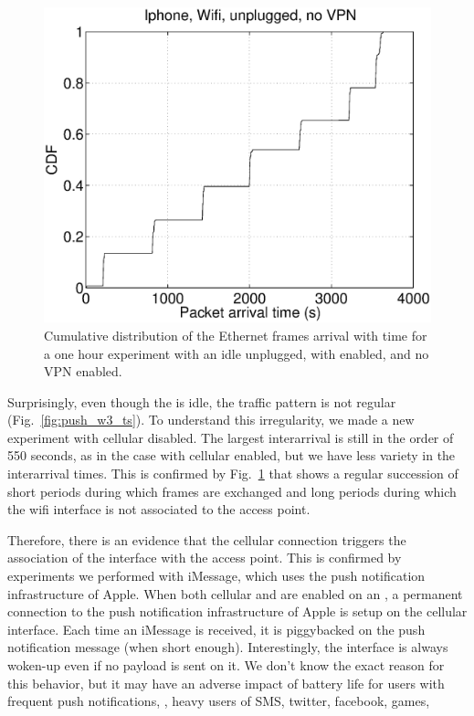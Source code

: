 
\begin{figure}
\centering
        \includegraphics[width=0.8\linewidth]{../../code/pushNotification/Fig/bw_iphone_wifi_unplug_novpn_ts.eps}
  \caption{Cumulative distribution of the Ethernet frames
          arrival with time for a one hour experiment with an idle
          \iphone{} unplugged, with \wifi{} enabled, and no VPN
          enabled.}
  \label{fig:push_w_ts}
\end{figure}

Surprisingly, even though the \iphone{} is idle, the traffic pattern
is not regular (Fig.~\ref{fig:push_w3_ts}). To
understand this irregularity, we made a new experiment with cellular
disabled. The largest
interarrival is still in the order of 550 seconds, as in the case with
cellular enabled, but we have less variety in the interarrival times. This
is confirmed by Fig.~\ref{fig:push_w_ts} that shows a regular
succession of short periods during which frames are exchanged and long
periods during which the wifi interface is not associated to the
access point.

Therefore, there is an evidence that the cellular connection triggers
the association of the \iphone{} \wifi interface with the access
point. This is confirmed by experiments we performed with iMessage, 
which uses the push notification infrastructure of Apple. When both
cellular and \wifi{} are enabled on an \iphone{}, a permanent connection to
the push notification infrastructure of Apple is setup on the cellular
interface. Each time an iMessage is received, it is piggybacked on the
push notification message (when short enough). Interestingly, the \wifi{}
interface is always woken-up even if no payload is sent on it. We
don't know the exact reason for this behavior, but it may have an
adverse impact of battery life for users with frequent push
notifications, \eg, heavy users of SMS, twitter, facebook, games, \etc

